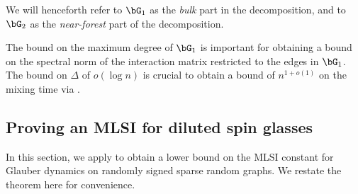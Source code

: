 \documentclass[11pt,letterpaper]{article}
\begin{document}
    \begin{remark}
        We will henceforth refer to $\bG_1$ as the \emph{bulk} part in the decomposition, and to $\bG_2$ as the \emph{near-forest} part of the decomposition.
    \end{remark}

    \begin{remark}
        The bound on the maximum degree of $\bG_1$ is important for obtaining a bound on the spectral norm of the interaction matrix restricted to the edges in $\bG_1$.
        The bound on $\Delta$ of $o(\log n)$ is crucial to obtain a bound of $n^{1+o(1)}$ on the mixing time via .
    \end{remark}

\subsection{Proving an MLSI for diluted spin glasses}
\label{sec:spinglass-mlsi}

    In this section, we apply  to obtain a lower bound on the MLSI constant for Glauber dynamics on randomly signed sparse random graphs. We restate the theorem here for convenience.
\end{document}
